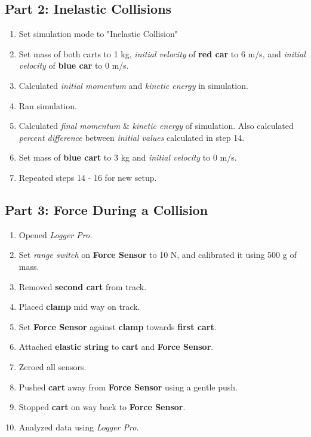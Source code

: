 \subsection{Part 2: Inelastic Collisions}

\begin{enumerate}[resume]
		\item Set simulation mode to "Inelastic Collision"

		\item Set mass of both carts to 1 kg, \emph{initial velocity }of \textbf{red
			car }to 6 m/s, and \emph{initial velocity }of \textbf{blue car }to 0 m/s.

		\item Calculated \emph{initial momentum }and \emph{kinetic energy }in simulation.

		\item Ran simulation.

		\item Calculated \emph{final momentum }\& \emph{kinetic energy }of simulation.
			Also calculated \emph{percent difference }between \emph{initial values }calculated
			in step 14.

		\item Set mass of \textbf{blue cart }to 3 kg and \emph{initial velocity }to 0
			m/s.

		\item Repeated steps 14 - 16 for new setup.
	\end{enumerate}

\subsection{Part 3: Force During a Collision}
\begin{enumerate}[resume]
		\item Opened \emph{Logger Pro.}

		\item Set \emph{range switch }on \textbf{Force Sensor }to 10 N, and
			calibrated it using 500 g of mass.

		\item Removed \textbf{second cart }from track.

		\item Placed \textbf{clamp }mid way on track.

		\item Set \textbf{Force Sensor }against \textbf{clamp }towards \textbf{first
			cart}.

		\item Attached \textbf{elastic string }to \textbf{cart }and \textbf{Force
			Sensor}.

		\item Zeroed all sensors.

		\item Pushed \textbf{cart }away from \textbf{Force Sensor }using a gentle push.

		\item Stopped \textbf{cart }on way back to \textbf{Force Sensor}.

		\item Analyzed data using \emph{Logger Pro.}
	\end{enumerate}
\newpage




